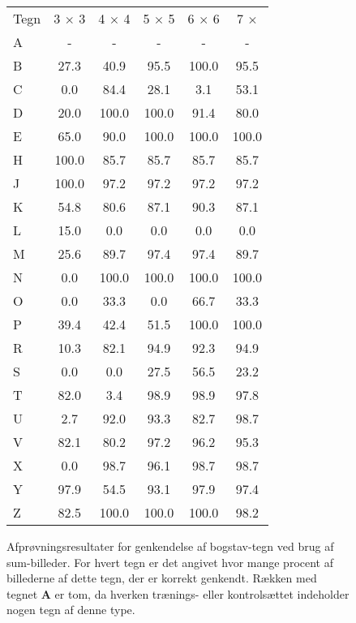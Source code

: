 \begin{figure}[htp]
\centering
\begin{tabular}{|l|c|c|c|c|c|}\hline
\rowcolor[gray]{0.9} \multicolumn{6}{|>{\columncolor[gray]{0.9}}c|}{\textbf{Sum-billeder}} \\ \hline
Tegn & 3 $\times$ 3 & 4 $\times$ 4 & 5 $\times$ 5 & 6 $\times$ 6 & 7 $\times$ \\\hline
A & - & - & - & - & -\\\hline
B & 27.3 & 40.9 & 95.5 & 100.0 & 95.5\\\hline
C & 0.0 & 84.4 & 28.1 & 3.1 & 53.1\\\hline
D & 20.0 & 100.0 & 100.0 & 91.4 & 80.0\\\hline
E & 65.0 & 90.0 & 100.0 & 100.0 & 100.0\\\hline
H & 100.0 & 85.7 & 85.7 & 85.7 & 85.7\\\hline
J & 100.0 & 97.2 & 97.2 & 97.2 & 97.2\\\hline
K & 54.8 & 80.6 & 87.1 & 90.3 & 87.1\\\hline 
L & 15.0 & 0.0 & 0.0 & 0.0 & 0.0\\\hline
M & 25.6 & 89.7 & 97.4 & 97.4 & 89.7\\\hline
N & 0.0 & 100.0 & 100.0 & 100.0 & 100.0\\\hline
O & 0.0 & 33.3 & 0.0 & 66.7 & 33.3\\\hline
P & 39.4 & 42.4 & 51.5 & 100.0 & 100.0\\\hline
R & 10.3 & 82.1 & 94.9 & 92.3 & 94.9\\\hline
S & 0.0 & 0.0 & 27.5 & 56.5 & 23.2\\\hline
T & 82.0 & 3.4 & 98.9 & 98.9 & 97.8\\\hline
U & 2.7 & 92.0 & 93.3 & 82.7 & 98.7\\\hline
V & 82.1 & 80.2 & 97.2 & 96.2 & 95.3\\\hline
X & 0.0 & 98.7 & 96.1 & 98.7 & 98.7\\\hline
Y & 97.9 & 54.5 & 93.1 & 97.9 & 97.4\\\hline
Z & 82.5 & 100.0 & 100.0 & 100.0 & 98.2\\\hline
\end{tabular}
\caption{Afprøvningsresultater for genkendelse af bogstav-tegn ved brug af sum-billeder. For hvert tegn er det angivet hvor mange procent af billederne af dette tegn, der er korrekt genkendt. Rækken med tegnet \textbf{A} er tom, da hverken trænings- eller kontrolsættet indeholder nogen tegn af denne type.}
\label{fig:test:sum_bogstav}
\end{figure}

